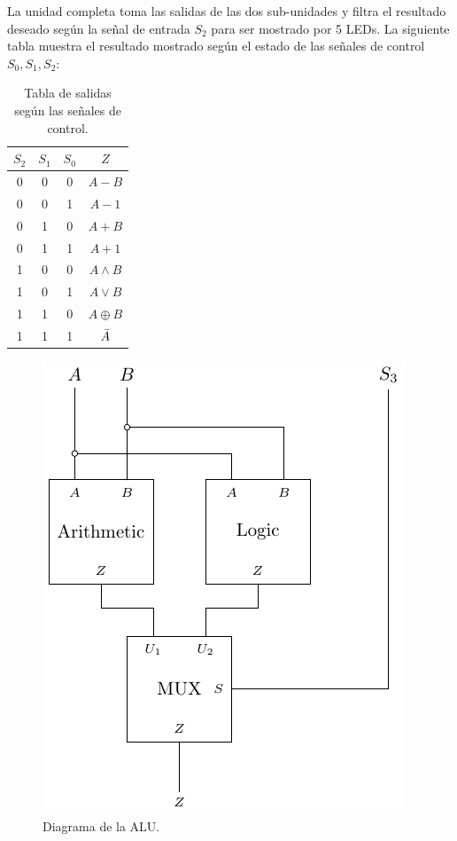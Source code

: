 \documentclass[journal, table]{IEEEtran}
\begin{document}
La unidad completa toma las salidas de las dos sub-unidades y filtra el resultado
deseado según la señal de entrada $S_2$ para ser mostrado por 5 LEDs.
La siguiente tabla muestra el resultado mostrado según el estado de las señales
de control $S_0, S_1, S_2$:

\begin{table}[htbp!]
    \centering
    \begin{tabular}{c|c|c||c}
    \toprule
        $S_2$ & $S_1$ & $S_0$ & $Z$ \\
        \midrule
        0 & 0 & 0 & $A - B$ \\
        0 & 0 & 1 & $A - 1$ \\
        0 & 1 & 0 & $A + B$ \\
        0 & 1 & 1 & $A + 1$ \\
        1 & 0 & 0 & $A \land B$ \\
        1 & 0 & 1 & $A \lor B$ \\
        1 & 1 & 0 & $A \oplus B$ \\
        1 & 1 & 1 & $\Bar{A}$ \\
        \bottomrule
    \end{tabular}
    \caption{Tabla de salidas según las señales de control.}
    \label{tab:Zvalue}
\end{table}

\begin{figure}[h]
    \centering
    \includegraphics[width=\linewidth]{./Images/alu.pdf}
    \caption{Diagrama de la ALU.}
    \label{fig:alu-diagram}
\end{figure}
\end{document}
